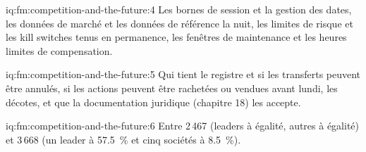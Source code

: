 \begin{solution}{iq:fm:competition-and-the-future:4}
Les bornes de session et la gestion des dates, les données de marché et les données de référence la nuit, les limites de risque et les kill switches tenus en permanence,
les fenêtres de maintenance et les heures limites de compensation.
\end{solution}

\begin{solution}{iq:fm:competition-and-the-future:5}
Qui tient le registre et si les transferts peuvent être annulés, si les actions peuvent être rachetées ou vendues avant lundi, les décotes, et que la
documentation juridique (chapitre 18) les accepte.
\end{solution}

\begin{solution}{iq:fm:competition-and-the-future:6}
Entre 2\,467 (leaders à égalité, autres à égalité) et 3\,668 (un leader à 57.5~\% et cinq sociétés à 8.5~\%).
\end{solution}

